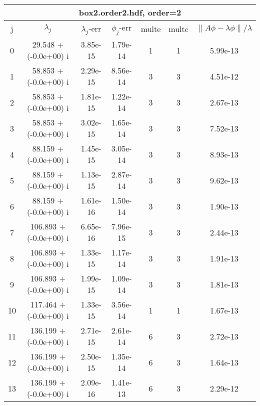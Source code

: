 \begin{table}[H]\tableFont %
\begin{center}
\begin{tabular}{|c|c|c|c|c|c|c|}  \hline
\multicolumn{7}{|c|}{box2.order2.hdf, order=2} \\ \hline
   j    &         $\lambda_j$        & $\lambda_j$-err  & $\phi_j$-err  & multe & multc & $\| A\phi - \lambda\phi\|/\lambda$     \\ \hline
     0  &     29.548 + (-0.0e+00) i  &    3.85e-15      &   1.79e-14    &   1    &  1   &    5.99e-13 \\
     1  &     58.853 + (-0.0e+00) i  &    2.29e-15      &   8.56e-14    &   3    &  3   &    4.51e-12 \\
     2  &     58.853 + (-0.0e+00) i  &    1.81e-15      &   1.22e-14    &   3    &  3   &    2.67e-13 \\
     3  &     58.853 + (-0.0e+00) i  &    3.02e-15      &   1.65e-14    &   3    &  3   &    7.52e-13 \\
     4  &     88.159 + (-0.0e+00) i  &    1.45e-15      &   3.05e-14    &   3    &  3   &    8.93e-13 \\
     5  &     88.159 + (-0.0e+00) i  &    1.13e-15      &   2.87e-14    &   3    &  3   &    9.62e-13 \\
     6  &     88.159 + (-0.0e+00) i  &    1.61e-16      &   1.50e-14    &   3    &  3   &    1.90e-13 \\
     7  &    106.893 + (-0.0e+00) i  &    6.65e-16      &   7.96e-15    &   3    &  3   &    2.44e-13 \\
     8  &    106.893 + (-0.0e+00) i  &    1.33e-15      &   1.17e-14    &   3    &  3   &    1.91e-13 \\
     9  &    106.893 + (-0.0e+00) i  &    1.99e-15      &   1.09e-14    &   3    &  3   &    1.81e-13 \\
    10  &    117.464 + (-0.0e+00) i  &    1.33e-15      &   3.56e-14    &   1    &  1   &    1.67e-13 \\
    11  &    136.199 + (-0.0e+00) i  &    2.71e-15      &   2.61e-14    &   6    &  3   &    2.72e-13 \\
    12  &    136.199 + (-0.0e+00) i  &    2.50e-15      &   1.35e-14    &   6    &  3   &    1.64e-13 \\
    13  &    136.199 + (-0.0e+00) i  &    2.09e-16      &   1.41e-13    &   6    &  3   &    2.29e-12 \\

\end{tabular}
\end{center}
\end{table}
